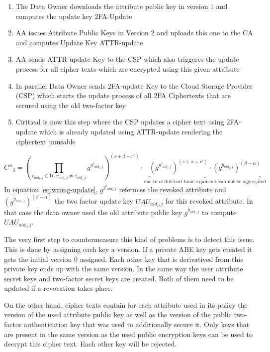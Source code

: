 \begin{enumerate}
\item The Data Owner downloads the attribute public key in version 1 and computes the update key 2FA-Update
\item AA issues Attribute Public Keys in Version 2 and uploads this one to the CA and computes Update Key ATTR-update
\item AA sends ATTR-update Key to the CSP which also triggeres the update process for all cipher texts which are encrypted using this given attribute 
\item In parallel Data Owner sends 2FA-update Key to the Cloud Storage Provider (CSP) which starts the update process of all 2FA Ciphertexts that are secured using the old two-factor key
\item Ciritical is now this step where the CSP updates a cipher text using 2FA-update which is already updated using ATTR-update rendering the ciphertext unusable
\end{enumerate}

\begin{equation}
C''_3 = 
\left(\prod_{v_{aid_{t},j} \in W, v_{aid_{t},j} \neq v_{aid_{i},j}} g^{y'_{aid_i,j}} \right)^{(s+\beta+r')}
\cdot 
\underbrace{
    \left(g^{y'_{aid_i,j}}\right)^{(s + \alpha + r')} 
    \cdot 
    \left(g^{y_{aid_i,j}}\right)^{(\beta - \alpha)} 
}_\text{due to of different basis exponents can not be aggregated} 
\label{eq:wrong-update}
\end{equation}
In equation \ref{eq:wrong-update}, $g^{y'_{aid_i,j}}$ refernces the revoked attribute and $\left(g^{y_{aid_i,j}}\right)^{(\beta - \alpha)}$ the two factor update key $UAU_{aid_i,j}$ for this revoked attribute. In that case the data owner used the old attribute public key $g^{y_{aid_i,j}}$ to compute $UAU_{aid_i,j}$.

The very first step to countermeasure this kind of problems is to detect this issue. This is done by assigning each key a version. If a private ABE key gets created it gets the initial version $0$ assigned. Each other key that is derivatived from this private key ends up with the same version. 
In the same way the user attribute secret keys and two-factor secret keys are created. Both of them need to be updated if a revocation takes place. 

On the other hand, cipher texts contain for each attribute used in its policy the version of the used attribute public key as well as the version of the public two-factor authentication key that was used to additionally secure it. Only keys that are present in the same version as the used public encryption keys can be used to decrypt this cipher text. Each other key will be rejected.

